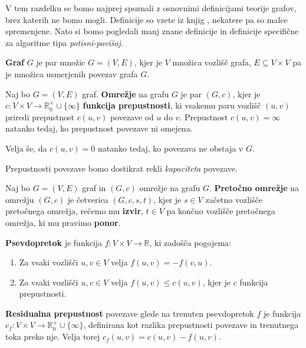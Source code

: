 \documentclass[mat1]{fmfdelo}
\begin{document}
V tem razdelku se bomo najprej spoznali z osnovnimi definicijami teorije grafov, brez katerih ne bomo mogli. Definicije so vzete iz knjig \cite{clrs, uvtg}, nekatere pa so malce spremenjene. Nato si bomo pogledali manj znane definicije in definicije specifične za algoritme tipa \textit{potisni-povišaj}.

\begin{definicija}
\textbf{Graf} $G$ je par množic $G = (V,E)$, kjer je $V$ množica vozlišč grafa, $E \subseteq V \times V$ pa je množica usmerjenih povezav grafa $G$.
\end{definicija}

\begin{definicija}\label{def:omrezjeprepustnost}
Naj bo $G = (V, E)$ graf. \textbf{Omrežje} na grafu $G$ je par $(G, c)$, kjer je $c \colon V \times V \rightarrow \mathbb{R}^+_0 \cup \{\infty\}$ \textbf{funkcija prepustnosti}, ki vsakemu paru vozlišč $(u,v)$ priredi prepustnost $c(u,v)$ povezave od $u$ do $v$. Prepustnost $c(u,v) = \infty$ natanko tedaj, ko prepustnost povezave ni omejena.

Velja še, da $c(u,v)=0$ natanko tedaj, ko povezava ne obstaja v $G$.
\end{definicija}

\begin{opomba}
Prepustnosti povezave bomo dostikrat rekli \textit{kapaciteta} povezave.
\end{opomba}

\begin{definicija}
Naj bo $G = (V,E)$ graf in $(G,c)$ omrežje na grafu $G$. \textbf{Pretočno omrežje} na omrežju $(G,c)$ je četverica $(G,c,s,t)$, kjer je $s\in V$ začetno vozlišče pretočnega omrežja, rečemo mu \textbf{izvir}, $t\in V$ pa končno vozlišče pretočnega omrežja, ki mu pravimo \textbf{ponor}.
\end{definicija}

\begin{definicija} \label{def:psevdopretok}
\textbf{Psevdopretok} je funkcija $f \colon V \times V \rightarrow \mathbb{R}$, ki zadošča pogojema:
\begin{enumerate}
\item Za vsaki vozlišči $u,v \in V$ velja $f(u,v) = - f(v,u)$.
\item Za vsaki vozlišči $u,v \in V$ velja $f(u,v) \leq c(u,v)$, kjer je $c$ funkcija prepustnosti.
\end{enumerate}
\end{definicija}

\begin{definicija}\label{def:resprepustnost}
\textbf{Residualna prepustnost} povezave glede na trenuten psevdopretok $f$ je funkcija $c_f \colon V \times V \rightarrow \mathbb{R}^+_0 \cup \{\infty\}$, definirana kot razlika prepustnosti povezave in trenutnega toka preko nje. Velja torej $c_f(u,v) = c(u,v) - f(u,v)$.
\end{definicija}
\end{document}
